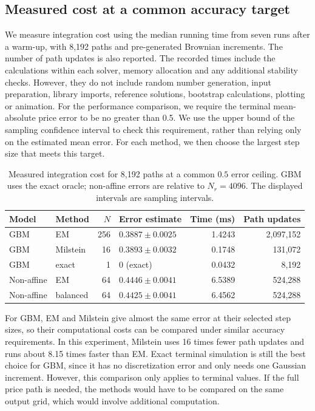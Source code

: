 \subsection{Measured cost at a common accuracy target}
\label{sec:cost}
We measure integration cost using the median running time from seven runs after a warm-up, with 8,192 paths and pre-generated Brownian increments. The number of path updates is also reported. The recorded times include the calculations within each solver, memory allocation and any additional stability checks. However, they do not include random number generation, input preparation, library imports, reference solutions, bootstrap calculations, plotting or animation. For the performance comparison, we require the terminal mean-absolute price error to be no greater than 0.5. We use the upper bound of the sampling confidence interval to check this requirement, rather than relying only on the estimated mean error. For each method, we then choose the largest step size that meets this target.

\begin{table}[H]\centering\small
\caption{Measured integration cost for 8,192 paths at a common $0.5$ error ceiling. GBM uses the exact oracle; non-affine errors are relative to $N_r=4096$. The displayed intervals are sampling intervals.}\label{tab:cost}
\begin{tabular}{llrlrr}\toprule
Model & Method & $N$ & Error estimate & Time (ms) & Path updates\\\midrule
GBM & EM & 256 & $0.3887\pm 0.0025$ & 1.4243 & 2,097,152\\
GBM & Milstein & 16 & $0.3893\pm 0.0032$ & 0.1748 & 131,072\\
GBM & exact & 1 & $0$ (exact) & 0.0432 & 8,192\\
Non-affine & EM & 64 & $0.4446\pm 0.0041$ & 6.5389 & 524,288\\
Non-affine & balanced & 64 & $0.4425\pm 0.0041$ & 6.4562 & 524,288\\
\bottomrule\end{tabular}\end{table}
For GBM, EM and Milstein give almost the same error at their selected step sizes, so their computational costs can be compared under similar accuracy requirements. In this experiment, Milstein uses 16 times fewer path updates and runs about 8.15 times faster than EM. Exact terminal simulation is still the best choice for GBM, since it has no discretization error and only needs one Gaussian increment. However, this comparison only applies to terminal values. If the full price path is needed, the methods would have to be compared on the same output grid, which would involve additional computation.

